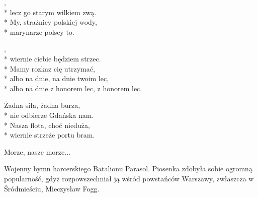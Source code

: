 \begin{lyrics}[longestline={albo na dnie z honorem lec, z honorem lec.}]

,\\*
lecz go starym wilkiem zwą.\\*
My, strażnicy polskiej wody,\\*
marynarze polscy to.

\begin{chorus}
,\\*
wiernie ciebie będziem strzec.\\*
Mamy rozkaz cię utrzymać,\\*
albo na dnie, na dnie twoim lec,\\*
albo na dnie z honorem lec, z honorem lec.
\end{chorus}

Żadna siła, żadna burza,\\*
nie odbierze Gdańska nam.\\*
Nasza flota, choć nieduża,\\*
wiernie strzeże portu bram.

\chorusref

Morze, nasze morze...
\end{lyrics}



\begin{info} Wojenny hymn harcerskiego Batalionu Parasol. Piosenka zdobyła sobie ogromną popularność, gdyż rozpowszechniał ją wśród powstańców Warszawy, zwłaszcza w Śródmieściu, Mieczysław Fogg.\end{info}


